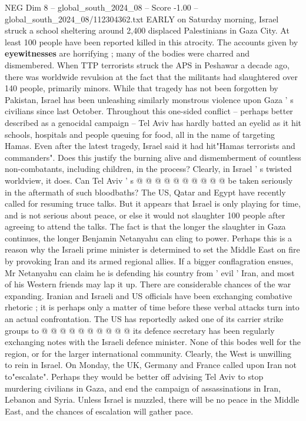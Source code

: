 \begin{textsample}{NEG Dim 8 – global\_south\_2024\_08 – Score -1.00 – global\_south\_2024\_08/112304362.txt}  \label{ex:f8_neg_285}
EARLY on Saturday morning, Israel struck a school sheltering around 2,400 displaced Palestinians in Gaza City.
At least 100 people have been reported killed in this atrocity.
The accounts given by \textbf{eyewitnesses} are horrifying ; many of the bodies were charred and dismembered.
When TTP terrorists struck the APS in Peshawar a decade ago, there was worldwide revulsion at the fact that the militants had slaughtered over 140 people, primarily minors.
While that tragedy has not been forgotten by Pakistan, Israel has been unleashing similarly monstrous violence upon Gaza ' s civilians since last October.
Throughout this one-sided conflict -- perhaps better described as a genocidal campaign -- Tel Aviv has hardly batted an eyelid as it hit schools, hospitals and people queuing for food, all in the name of targeting Hamas.
Even after the latest tragedy, Israel said it had hit"Hamas terrorists and commanders".
Does this justify the burning alive and dismemberment of countless non-combatants, including children, in the process?
Clearly, in Israel ' s twisted worldview, it does.
Can Tel Aviv ' s @ @ @ @ @ @ @ @ @ @ be taken seriously in the aftermath of such bloodbaths?
The US, Qatar and Egypt have recently called for resuming truce talks.
But it appears that Israel is only playing for time, and is not serious about peace, or else it would not slaughter 100 people after agreeing to attend the talks.
The fact is that the longer the slaughter in Gaza continues, the longer Benjamin Netanyahu can cling to power.
Perhaps this is a reason why the Israeli prime minister is determined to set the Middle East on fire by provoking Iran and its armed regional allies.
If a bigger conflagration ensues, Mr Netanyahu can claim he is defending his country from ' evil ' Iran, and most of his Western friends may lap it up.
There are considerable chances of the war expanding.
Iranian and Israeli and US officials have been exchanging combative rhetoric ; it is perhaps only a matter of time before these verbal attacks turn into an actual confrontation.
The US has reportedly asked one of its carrier strike groups to @ @ @ @ @ @ @ @ @ @ its defence secretary has been regularly exchanging notes with the Israeli defence minister.
None of this bodes well for the region, or for the larger international community.
Clearly, the West is unwilling to rein in Israel.
On Monday, the UK, Germany and France called upon Iran not to"escalate".
Perhaps they would be better off advising Tel Aviv to stop murdering civilians in Gaza, and end the campaign of assassinations in Iran, Lebanon and Syria.
Unless Israel is muzzled, there will be no peace in the Middle East, and the chances of escalation will gather pace.

\end{textsample}
